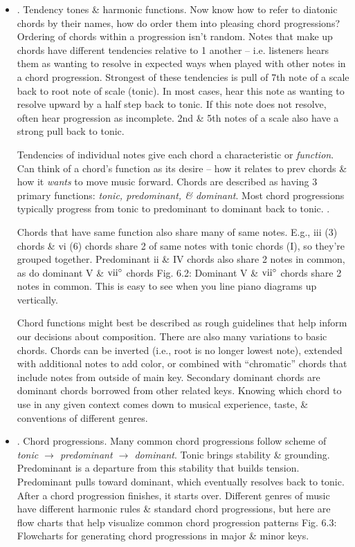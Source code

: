 \documentclass{article}
\begin{document}
\begin{itemize}
\begin{itemize}
		\item {. Tendency tones \& harmonic functions.} Now know how to refer to diatonic chords by their names, how do order them into pleasing chord progressions? Ordering of chords within a progression isn't random. Notes that make up chords have different tendencies relative to 1 another -- i.e. listeners hears them as wanting to resolve in expected ways when played with other notes in a chord progression. Strongest of these tendencies is pull of 7th note of a scale back to root note of scale (tonic). In most cases, hear this note as wanting to resolve upward by a half step back to tonic. If this note does not resolve, often hear progression as incomplete. 2nd \& 5th notes of a scale also have a strong pull back to tonic.
		
		Tendencies of individual notes give each chord a characteristic or {\it function}. Can think of a chord's function as its desire -- how it relates to prev chords \& how it {\it wants} to move music forward. Chords are described as having 3 primary functions: {\it tonic, predominant, \& dominant}. Most chord progressions typically progress from tonic to predominant to dominant back to tonic. {}.
		
		Chords that have same function also share many of same notes. E.g., iii (3) chords \& vi (6) chords share 2 of same notes with tonic chords (I), so they're grouped together. Predominant ii \& IV chords also share 2 notes in common, as do dominant V \& $\rm vii^\circ$ chords {\sf Fig. 6.2: Dominant V \& $\rm vii^\circ$ chords share 2 notes in common. This is easy to see when you line piano diagrams up vertically.}
		
		Chord functions might best be described as rough guidelines that help inform our decisions about composition. There are also many variations to basic chords. Chords can be inverted (i.e., root is no longer lowest note), extended with additional notes to add color, or combined with ``chromatic'' chords that include notes from outside of main key. Secondary dominant chords are dominant chords borrowed from other related keys. Knowing which chord to use in any given context comes down to musical experience, taste, \& conventions of different genres.
		\item {. Chord progressions.} Many common chord progressions follow scheme of {\it tonic $\to$ predominant $\to$ dominant}. Tonic brings stability \& grounding. Predominant is a departure from this stability that builds tension. Predominant pulls toward dominant, which eventually resolves back to tonic. After a chord progression finishes, it starts over. Different genres of music have different harmonic rules \& standard chord progressions, but here are flow charts that help visualize common chord progression patterns {\sf Fig. 6.3: Flowcharts for generating chord progressions in major \& minor keys.}
		

\end{itemize}
\end{itemize}
\end{document}
